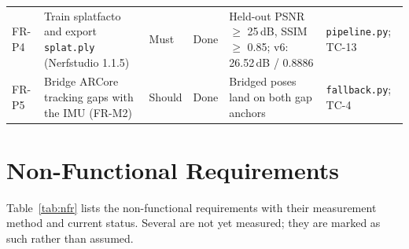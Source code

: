{\begin{longtable}{p{}p{}p{}p{}p{}p{}}
FR-P4 & Train splatfacto and export \texttt{splat.ply} (Nerfstudio 1.1.5) & Must & Done & Held-out PSNR $\geq$ 25\,dB, SSIM $\geq$ 0.85; v6: 26.52\,dB / 0.8886 & \texttt{pipeline.py}; TC-13 \\
FR-P5 & Bridge ARCore tracking gaps with the IMU (FR-M2) & Should & Done & Bridged poses land on both gap anchors & \texttt{fallback.py}; TC-4 \\
\bottomrule
\end{longtable}
}

\section{Non-Functional Requirements}
Table~\ref{tab:nfr} lists the non-functional requirements with their measurement method and current status. Several are not yet measured; they are marked as such rather than assumed.

